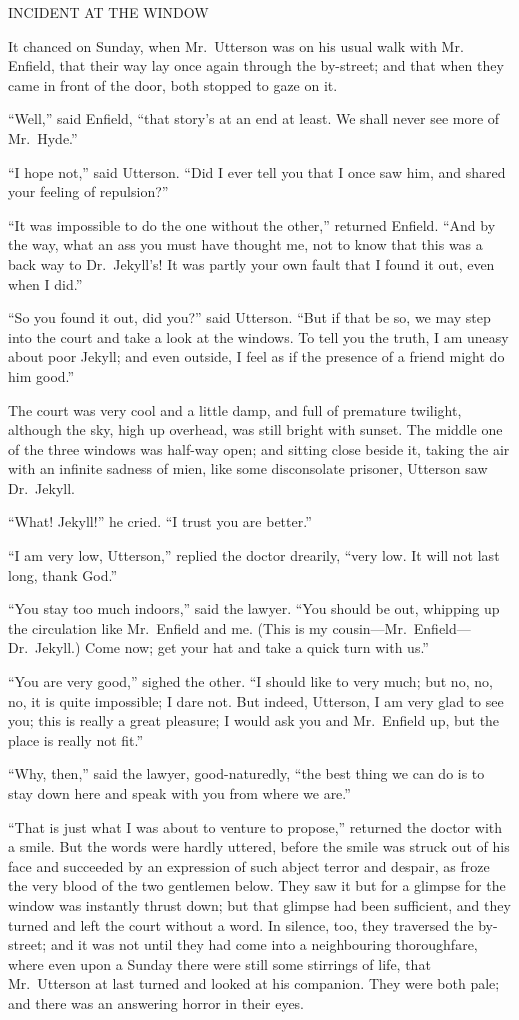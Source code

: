 \documentclass[12pt,openright]{book}
\begin{document}
INCIDENT AT THE WINDOW

It chanced on Sunday, when Mr. Utterson was on his usual walk with Mr. Enfield, that their way lay once again through the by-street; and that when they came in front of the door, both stopped to gaze on it.

“Well,” said Enfield, “that story’s at an end at least. We shall never see more of Mr. Hyde.”

“I hope not,” said Utterson. “Did I ever tell you that I once saw him, and shared your feeling of repulsion?”

“It was impossible to do the one without the other,” returned Enfield. “And by the way, what an ass you must have thought me, not to know that this was a back way to Dr. Jekyll’s! It was partly your own fault that I found it out, even when I did.”

“So you found it out, did you?” said Utterson. “But if that be so, we may step into the court and take a look at the windows. To tell you the truth, I am uneasy about poor Jekyll; and even outside, I feel as if the presence of a friend might do him good.”

The court was very cool and a little damp, and full of premature twilight, although the sky, high up overhead, was still bright with sunset. The middle one of the three windows was half-way open; and sitting close beside it, taking the air with an infinite sadness of mien, like some disconsolate prisoner, Utterson saw Dr. Jekyll.

“What! Jekyll!” he cried. “I trust you are better.”

“I am very low, Utterson,” replied the doctor drearily, “very low. It will not last long, thank God.”

“You stay too much indoors,” said the lawyer. “You should be out, whipping up the circulation like Mr. Enfield and me. (This is my cousin—Mr. Enfield—Dr. Jekyll.) Come now; get your hat and take a quick turn with us.”

“You are very good,” sighed the other. “I should like to very much; but no, no, no, it is quite impossible; I dare not. But indeed, Utterson, I am very glad to see you; this is really a great pleasure; I would ask you and Mr. Enfield up, but the place is really not fit.”

“Why, then,” said the lawyer, good-naturedly, “the best thing we can do is to stay down here and speak with you from where we are.”

“That is just what I was about to venture to propose,” returned the doctor with a smile. But the words were hardly uttered, before the smile was struck out of his face and succeeded by an expression of such abject terror and despair, as froze the very blood of the two gentlemen below. They saw it but for a glimpse for the window was instantly thrust down; but that glimpse had been sufficient, and they turned and left the court without a word. In silence, too, they traversed the by-street; and it was not until they had come into a neighbouring thoroughfare, where even upon a Sunday there were still some stirrings of life, that Mr. Utterson at last turned and looked at his companion. They were both pale; and there was an answering horror in their eyes.
\end{document}
